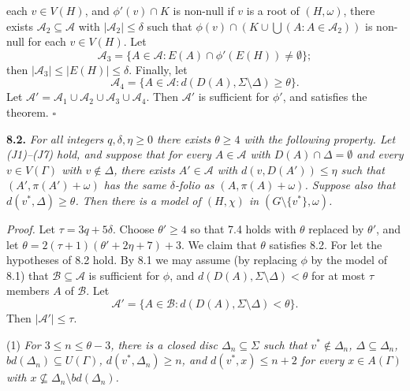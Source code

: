 \noindent each $v \in V(H)$, and $\phi'(v) \cap K$ is non-null if $v$ is a root of $(H, \omega)$, there exists $\mathcal{A}_2 \subseteq \mathcal{A}$ with $|\mathcal{A}_2| \le \delta$ such that $\phi(v) \cap (K \cup \bigcup(A : A \in \mathcal{A}_2))$ is non-null for each $v \in V(H)$. Let
\begin{equation*}
\mathcal{A}_3 = \{A \in \mathcal{A} : E(A) \cap \phi'(E(H)) \ne \emptyset\};
\end{equation*}
then $|\mathcal{A}_3| \le |E(H)| \le \delta$. Finally, let
\begin{equation*}
\mathcal{A}_4 = \{A \in \mathcal{A} : d(D(A), \Sigma \setminus \Delta) \ge \theta\}.
\end{equation*}
Let $\mathcal{A}' = \mathcal{A}_1 \cup \mathcal{A}_2 \cup \mathcal{A}_3 \cup \mathcal{A}_4$. Then $\mathcal{A}'$ is sufficient for $\phi'$, and satisfies the theorem. $\square$

\textbf{8.2.} \textit{For all integers $q, \delta, \eta \ge 0$ there exists $\theta \ge 4$ with the following property. Let (J1)--(J7) hold, and suppose that for every $A \in \mathcal{A}$ with $D(A) \cap \Delta = \emptyset$ and every $v \in V(\Gamma)$ with $v \notin \Delta$, there exists $A' \in \mathcal{A}$ with $d(v, D(A')) \le \eta$ such that $(A', \pi(A') + \omega)$ has the same $\delta$-folio as $(A, \pi(A) + \omega)$. Suppose also that $d(v^*, \Delta) \ge \theta$. Then there is a model of $(H, \chi)$ in $(G \setminus \{v^*\}, \omega)$.}

\textit{Proof.} Let $\tau = 3q + 5\delta$. Choose $\theta' \ge 4$ so that 7.4 holds with $\theta$ replaced by $\theta'$, and let $\theta = 2(\tau + 1)(\theta' + 2\eta + 7) + 3$. We claim that $\theta$ satisfies 8.2. For let the hypotheses of 8.2 hold. By 8.1 we may assume (by replacing $\phi$ by the model of 8.1) that $\mathcal{B} \subseteq \mathcal{A}$ is sufficient for $\phi$, and $d(D(A), \Sigma \setminus \Delta) < \theta$ for at most $\tau$ members $A$ of $\mathcal{B}$. Let
\begin{equation*}
\mathcal{A}' = \{A \in \mathcal{B} : d(D(A), \Sigma \setminus \Delta) < \theta\}.
\end{equation*}
Then $|\mathcal{A}'| \le \tau$.

\hspace*{12pt}(1) \textit{For $3 \le n \le \theta - 3$, there is a closed disc $\Delta_n \subseteq \Sigma$ such that $v^* \notin \Delta_n$, $\Delta \subseteq \Delta_n$, $bd(\Delta_n) \subseteq U(\Gamma)$, $d(v^*, \Delta_n) \ge n$, and $d(v^*, x) \le n + 2$ for every $x \in A(\Gamma)$ with $x \not\subseteq \Delta_n \setminus bd(\Delta_n)$.}

